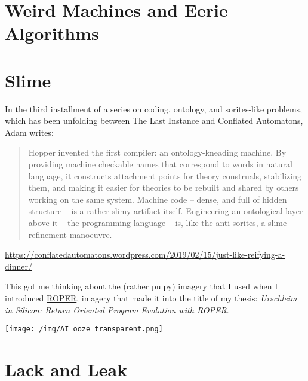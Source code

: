 \documentclass[11pt]{article}
\date{\today}
\title{}
\begin{document}
\tableofcontents

\section{Weird Machines and Eerie Algorithms}
\label{sec:org488ff0c}
\section{Slime}
\label{sec:orga4e9122}

In the third installment of a series on coding, ontology, and sorites-like
problems, which has been unfolding between The Last Instance and
Conflated Automatons, Adam writes:

\begin{quote}
Hopper invented the first compiler: an ontology-kneading machine. By providing
machine checkable names that correspond to words in natural language, it
constructs attachment points for theory construals, stabilizing them, and making
it easier for theories to be rebuilt and shared by others working on the same
system. Machine code – dense, and full of hidden structure – is a rather slimy
artifact itself. Engineering an ontological layer above it – the programming
language – is, like the anti-sorites, a slime refinement manoeuvre.
\end{quote}

\url{https://conflatedautomatons.wordpress.com/2019/02/15/just-like-reifying-a-dinner/}

This got me thinking about the (rather pulpy) imagery that I used when
I introduced \href{http://roper.eschtronics.ca}{ROPER}, imagery that made it into the title of my thesis:
\emph{Urschleim in Silicon: Return Oriented Program Evolution with ROPER}.

\begin{center}
\texttt{[image: /img/AI\_ooze\_transparent.png]}
\end{center}

\section{Lack and Leak}
\label{sec:org961d37b}
\end{document}
